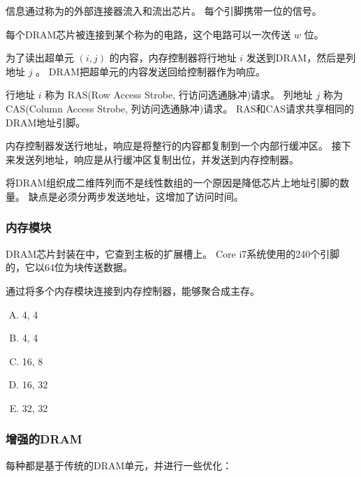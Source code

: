 {{{            信息通过称为的外部连接器流入和流出芯片。
            每个引脚携带一位的信号。

            每个DRAM芯片被连接到某个称为的电路，这个电路可以一次传送 $w$ 位。

            为了读出超单元 $(i, j)$ 的内容，内存控制器将行地址 $i$ 发送到DRAM，然后是列地址 $j$ 。
            DRAM把超单元的内容发送回给控制器作为响应。

            行地址 $i$ 称为 RAS(Row Access Strobe, 行访问选通脉冲)请求。
            列地址 $j$ 称为 CAS(Column Access Strobe, 列访问选通脉冲)请求。
            RAS和CAS请求共享相同的DRAM地址引脚。

            内存控制器发送行地址，响应是将整行的内容都复制到一个内部行缓冲区。
            接下来发送列地址，响应是从行缓冲区复制出位，并发送到内存控制器。

            将DRAM组织成二维阵列而不是线性数组的一个原因是降低芯片上地址引脚的数量。
            缺点是必须分两步发送地址，这增加了访问时间。
        }

        \subsubsection{内存模块}
        {
            DRAM芯片封装在中，它查到主板的扩展槽上。
            Core i7系统使用的240个引脚的，它以64位为块传送数据。

            通过将多个内存模块连接到内存控制器，能够聚合成主存。

            \begin{practicec}
                \begin{enumerate}[A.]
                    \item 4, 4
                    \item 4, 4
                    \item 16, 8
                    \item 16, 32
                    \item 32, 32
                \end{enumerate}
            \end{practicec}
        }

        \subsubsection{增强的DRAM}
        {
            每种都是基于传统的DRAM单元，并进行一些优化：

}}}
